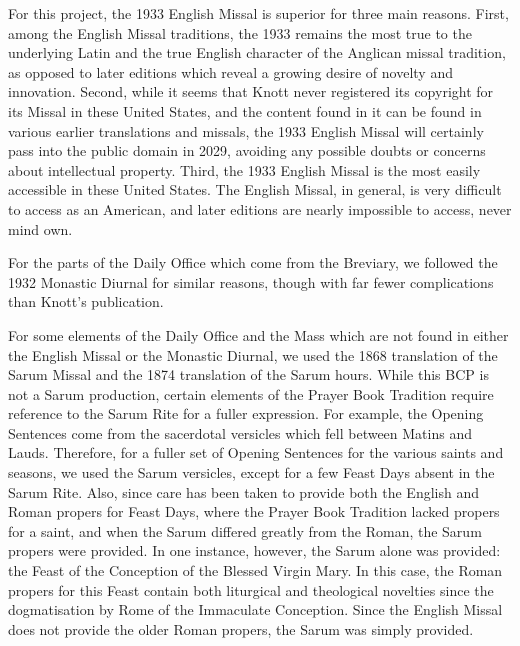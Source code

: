 For this project, the 1933 English Missal is superior for three main reasons. First, among the English Missal traditions, the 1933 remains the most true to the underlying Latin and the true English character of the Anglican missal tradition, as opposed to later editions which reveal a growing desire of novelty and innovation. Second, while it seems that Knott never registered its copyright for its Missal in these United States, and the content found in it can be found in various earlier translations and missals, the 1933 English Missal will certainly pass into the public domain in 2029, avoiding any possible doubts or concerns about intellectual property. Third, the 1933 English Missal is the most easily accessible in these United States. The English Missal, in general, is very difficult to access as an American, and later editions are nearly impossible to access, never mind own.


For the parts of the Daily Office which come from the Breviary, we followed the 1932 Monastic Diurnal for similar reasons, though with far fewer complications than Knott's publication.

For some elements of the Daily Office and the Mass which are not found in either the English Missal or the Monastic Diurnal, we used the 1868 translation of the Sarum Missal and the 1874 translation of the Sarum hours. While this BCP is not a Sarum production, certain elements of the Prayer Book Tradition require reference to the Sarum Rite for a fuller expression. For example, the Opening Sentences come from the sacerdotal versicles which fell between Matins and Lauds. Therefore, for a fuller set of Opening Sentences for the various saints and seasons, we used the Sarum versicles, except for a few Feast Days absent in the Sarum Rite. Also, since care has been taken to provide both the English and Roman propers for Feast Days, where the Prayer Book Tradition lacked propers for a saint, and when the Sarum differed greatly from the Roman, the Sarum propers were provided. In one instance, however, the Sarum alone was provided: the Feast of the Conception of the Blessed Virgin Mary. In this case, the Roman propers for this Feast contain both liturgical and theological novelties since the dogmatisation by Rome of the Immaculate Conception. Since the English Missal does not provide the older Roman propers, the Sarum was simply provided.

